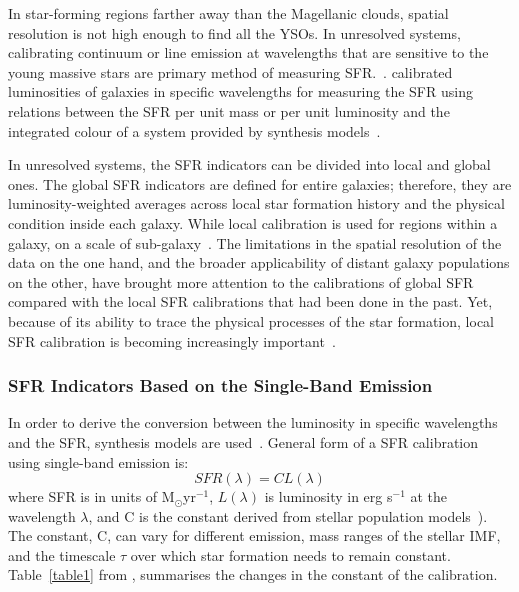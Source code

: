  In star-forming regions farther away than the Magellanic clouds, spatial resolution is not high enough to find all the YSOs. 
 In unresolved systems, calibrating continuum or line emission at wavelengths that are sensitive to the young massive stars are primary method of measuring SFR.~\citep[e.g.,][]{Kennicutt98b, Kewley02, Bell03, Calzetti07, Calzetti08, Calzetti10, Calzetti13, Kennicutt07, Kennicutt09, Boquien10, Hao11, Kennicutt12}. 
\cite{Kennicutt98b} calibrated luminosities of galaxies in specific wavelengths for measuring the SFR using relations between the SFR per unit mass or per unit luminosity and the integrated colour of a system provided by synthesis models~\citep[e.g.,][]{Bruzual93}. 

In unresolved systems, the SFR indicators can be divided into local and global ones. 
The global SFR indicators are defined for entire galaxies; therefore, they are luminosity-weighted averages across local star formation history and the physical condition inside each galaxy. 
While local calibration is used for regions within a galaxy, on a scale of sub-galaxy~\citep[e.g.,][]{Zhu08, Kennicutt09, Boquien10, Boquien11, Hao11}.
The limitations in the spatial resolution of the data on the one hand, and the broader applicability of distant galaxy populations on the other, have brought more attention to the calibrations of global SFR compared with the local SFR calibrations that had been done in the past. 
Yet, because of its ability to trace the physical processes of the star formation, local SFR calibration is becoming increasingly important~\citep{Calzetti13}.

\subsubsection*{SFR Indicators Based on the Single-Band Emission}

In order to derive the conversion between the luminosity in specific wavelengths and the SFR, synthesis models are used~\citep{Kennicutt98b}. 
General form of a SFR calibration using single-band emission is: 
\begin{equation}
\label{equ: sfrsingle}
SFR(\lambda)= CL(\lambda)
\end{equation}
where SFR is in units of M${_\odot}$yr$^{-1}$, $L(\lambda)$ is luminosity in erg s$^{-1}$ at the wavelength $\lambda$, and C is the constant derived from stellar population models~\citep[e.g, starburst99][]{Leitherer99}). 
The constant, C, can vary for different emission, mass ranges of the stellar IMF, and the timescale $\tau$ over which star formation needs to remain constant. 
Table~\ref{table1} from \cite{Calzetti13}, summarises the changes in the constant of the calibration. 

